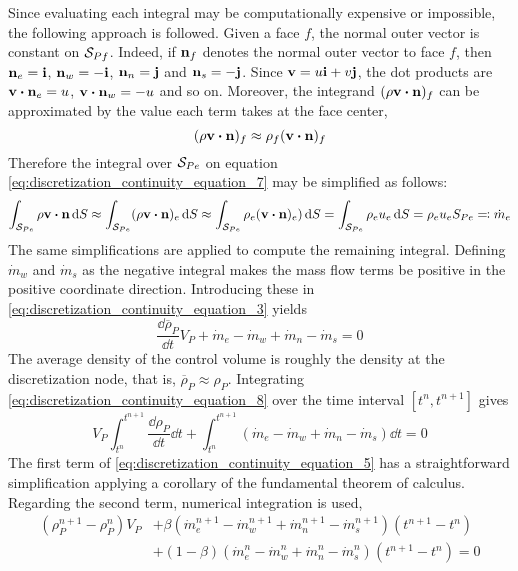 Since evaluating each integral may be computationally expensive or impossible, the following approach is followed. Given a face $f$, the normal outer vector is constant on $\mathcal{S}_{Pf}$. Indeed, if $\vb{n}_f$ denotes the normal outer vector to face $f$, then $\vb{n}_e = \vb{i}$, $\vb{n}_w = -\vb{i}$, $\vb{n}_n = \vb{j}$ and $\vb{n}_s = -\vb{j}$. Since $\vb{v} = u \vb{i} + v \vb{j}$, the dot products are $\vb{v} \vdot \vb{n}_e = u$, $\vb{v} \vdot \vb{n}_w = -u$ and so on. Moreover, the integrand $(\rho \vb{v} \vdot \vb{n})_f$ can be approximated by the value each term takes at the face center, \ie
\begin{equation}
	(\rho \vb{v} \vdot \vb{n})_f \approx \rho_f (\vb{v} \vdot \vb{n})_f
\end{equation}
Therefore the integral over $\mathcal{S}_{Pe}$ on equation \eqref{eq:discretization_continuity_equation_7} may be simplified as follows:
\begin{align}
	\int_{\cs{Pe}} \rho \vb{v} \vdot \vb{n} \dd{S} \approx
	\int_{\cs{Pe}} (\rho \vb{v} \vdot \vb{n})_e \dd{S} \approx
	\int_{\cs{Pe}} \rho_e (\vb{v} \vdot \vb{n})_e) \dd{S} = 
	\int_{\cs{Pe}} \rho_e u_e \dd{S} = 
	\rho_e u_e S_{Pe} \eqqcolon \dot{m}_e
\end{align}
The same simplifications are applied to compute the remaining integral. Defining $\dot{m}_w$ and $\dot{m}_s$ as the negative integral makes the mass flow terms be positive in the positive coordinate direction. Introducing these in \eqref{eq:discretization_continuity_equation_3} yields
\begin{equation} \label{eq:discretization_continuity_equation_8}
	\frac{\dd \overline{\rho}_P}{\dd{t}} V_P 
	+ \dot{m}_e - \dot{m}_w + \dot{m}_n - \dot{m}_s = 0
\end{equation}
The average density of the control volume is roughly the density at the discretization node, that is, $\overline{\rho}_P \approx \rho_P$. Integrating \eqref{eq:discretization_continuity_equation_8} over the time interval $[t^n, t^{n+1}]$ gives
\begin{equation} \label{eq:discretization_continuity_equation_5}
	V_P \int_{t^n}^{t^{n+1}} \frac{\dd \rho_P}{\dd{t}} \dd{t} + 
	\int_{t^n}^{t^{n+1}} ( \dot{m}_e - \dot{m}_w + \dot{m}_n - \dot{m}_s ) \dd{t} = 0
\end{equation}
The first term of \eqref{eq:discretization_continuity_equation_5} has a straightforward simplification applying a corollary of the fundamental theorem of calculus. Regarding the second term, numerical integration is used,
\begin{align} 
	(\rho_P^{n+1} - \rho_P^n) V_P
	&+ \beta (\dot{m}_e^{n+1} - \dot{m}_w^{n+1} + \dot{m}_n^{n+1} - \dot{m}_s^{n+1}) (t^{n+1} - t^n) 
	\nonumber \\
	&+ (1 - \beta) (\dot{m}_e^n - \dot{m}_w^n + \dot{m}_n^n - \dot{m}_s^n) (t^{n+1} - t^n) = 0
	\label{eq:discretization_continuity_equation_6}
\end{align}
